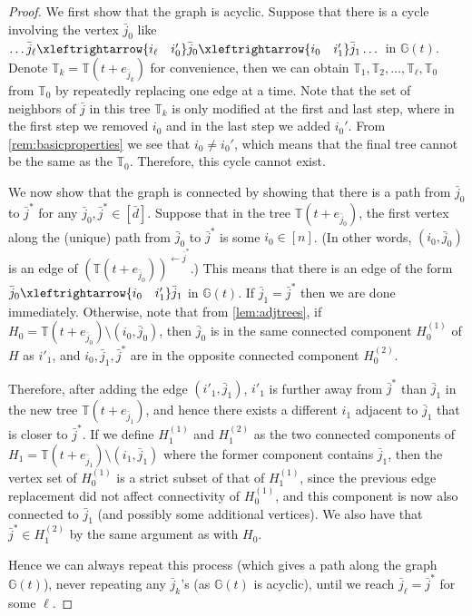 \documentclass[letterpaper,reqno,11pt]{amsart}
\begin{document}
\begin{proof}
    We first show that the graph is acyclic. Suppose that there is a cycle involving the vertex $\bar{j}_0$ like $\dots \bar{j}_\ell \xleftrightarrow{i_{\ell}\quad i'_0} \bar{j}_0 \xleftrightarrow{i_0\quad i'_{1}} \bar{j}_1 \dots$ in $\mathbb{G}(t)$. Denote $\mathbb{T}_k = \mathbb{T}(t+e_{\bar{j}_k})$ for convenience, then we can obtain $\mathbb{T}_1, \mathbb{T}_2, \dots, \mathbb{T}_\ell, \mathbb{T}_0 $ from $\mathbb{T}_0$ by repeatedly replacing one edge at a time. Note that the set of neighbors of $\bar{j}$ in this tree $\mathbb{T}_k$ is only modified at the first and last step, where in the first step we removed $i_0$ and in the last step we added $i_0'$. From \cref{rem:basicproperties} we see that $i_0 \neq i_0'$, which means that the final tree cannot be the same as the $\mathbb{T}_0$. Therefore, this cycle cannot exist.

    We now show that the graph is connected by showing that there is a path from $\bar{j}_0$ to $\bar{j}^*$ for any $\bar{j}_0, \bar{j}^*\in [\bar{d}]$. Suppose that in the tree $\mathbb{T}(t+e_{\bar{j}_0})$, the first vertex along the (unique) path from $\bar{j}_0$ to $\bar{j}^*$ is some $i_0\in [n]$. (In other words, $(i_0, \bar{j}_0)$ is an edge of $(\mathbb{T}(t+e_{\bar{j}_0}))^{\leftarrow\bar{j}^*}$.) This means that there is an edge of the form $\bar{j}_0 \xleftrightarrow{i_0\quad i'_1}\bar{j}_1$ in $\mathbb{G}(t)$. If $\bar{j}_1 = \bar{j}^*$ then we are done immediately. 
    Otherwise, note that from \cref{lem:adjtrees}, if $H_0 = \mathbb{T}(t+e_{\bar{j}_0})\setminus (i_0, \bar{j}_0)$, then $\bar{j}_0$ is in the same connected component $H_0^{(1)}$ of $H$ as $i'_1$, and $i_0, \bar{j}_1, \bar{j}^*$ are in the opposite connected component $H_0^{(2)}$. 
    
    Therefore, after adding the edge $(i'_1, \bar{j}_1)$, $i'_1$ is further away from $\bar{j}^*$ than $\bar{j}_1$ in the new tree $\mathbb{T}(t+e_{\bar{j}_1})$, and hence there exists a different $i_1$ adjacent to $\bar{j}_1$ that is closer to $\bar{j}^*$. If we define $H_1^{(1)}$ and $H_1^{(2)}$ as the two connected components of $H_1 = \mathbb{T}(t+e_{\bar{j}_1})\setminus (i_1, \bar{j}_1)$ where the former component contains $\bar{j}_1$, then the vertex set of $H_0^{(1)}$ is a strict subset of that of $H_1^{(1)}$, since the previous edge replacement did not affect connectivity of $H_0^{(1)}$, and this component is now also connected to $\bar{j}_1$ (and possibly some additional vertices). We also have that $\bar{j}^*\in H_1^{(2)}$ by the same argument as with $H_0$.
    
    Hence we can always repeat this process (which gives a path along the graph $\mathbb{G}(t)$), never repeating any $\bar{j}_k$'s (as $\mathbb{G}(t)$ is acyclic), until we reach $\bar{j}_\ell = \bar{j}^*$ for some $\ell$.
\end{proof}
\end{document}
